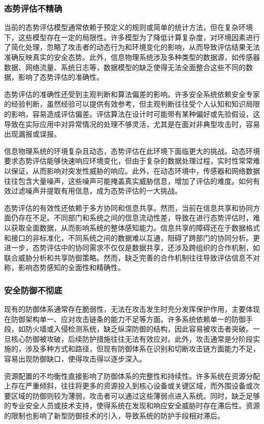 \subsubsection{态势评估不精确}


当前的态势评估模型通常依赖于预定义的规则或简单的统计方法，但在复杂环境下，这些模型存在一定的局限性。许多模型为了降低计算复杂度，对环境因素进行了简化处理，忽略了攻击者的动态行为和环境变化的影响，从而导致评估结果无法准确反映真实的安全态势。此外，信息物理系统涉及多种类型的数据源，如传感器数据、网络流量、系统日志等，数据模型的缺乏使得无法全面整合这些不同的数据，影响了态势评估的准确性。

态势评估的准确性还受到主观判断和算法偏差的影响。许多安全系统依赖安全专家的经验判断，虽然经验可以提供有效参考，但主观判断往往受个人认知和知识局限的影响，容易造成评估偏差。评估算法在设计时可能带有某种偏好或先验假设，这导致在实际应用中对异常情况的处理不够灵活，尤其是在面对非典型攻击时，容易出现漏报或误报。

信息物理系统的环境复杂且动态，态势评估在此环境下面临更大的挑战。动态环境要求态势评估能够快速响应环境变化，但由于复杂的数据处理过程，实时性常常难以保证，从而影响对突发性威胁的响应。此外，在动态环境中，传感器和网络数据往往包含大量噪声，这些噪声可能掩盖真实威胁信息，增加了评估的难度。如何有效过滤噪声并提取有用信息，成为态势评估的一大挑战。

态势评估的有效性还依赖于多方协同和信息共享。然而，当前在信息共享和协同方面仍存在不足。不同部门和系统之间的信息流动性差，导致在进行态势评估时，难以获取全面数据，从而影响系统的整体感知能力。信息共享的障碍还在于数据格式和接口的非标准化，不同系统之间的数据难以互通，阻碍了跨部门的协同分析。更进一步，态势评估中的协同需求不仅仅是数据共享，还涉及跨组织的合作机制，如联合威胁分析和共享防御策略。然而，缺乏完善的合作机制往往导致评估信息不对称，影响态势感知的全面性和精确性。

\subsubsection{安全防御不彻底}

现有的防御体系通常存在脆弱性，无法在攻击发生时充分发挥保护作用，主要体现在防御架构单一、应对攻击链条的能力不足等方面。许多系统依赖单一的防御手段，如防火墙或入侵检测系统，缺乏纵深防御的结构，因此容易被攻击者突破。一旦核心防御被攻破，后续防护措施往往无法有效应对。此外，攻击通常是分阶段实施的，涉及多种方式和路径，但现有防御体系在识别和切断攻击链方面能力不足，容易出现防御缺口，使得攻击得以逐步深入。

资源配置的不均衡性直接影响了防御体系的完整性和持续性。许多系统在资源分配上存在严重倾斜，往往将更多的资源投入到核心设备或关键区域，而外围设备或次要区域的防御则较为薄弱，攻击者可以通过这些薄弱点进入系统。同时，缺乏足够的专业安全人员或技术支持，使得系统在发现和响应安全威胁时存在滞后性。资源的限制也影响了新型防御技术的引入，导致系统的防护手段相对滞后。

